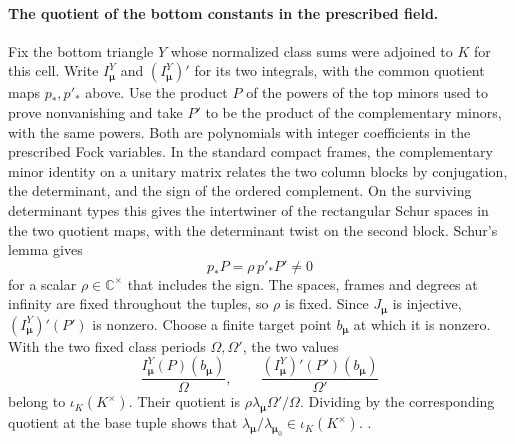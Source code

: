 \paragraph{The quotient of the bottom constants in the prescribed field.}
Fix the bottom triangle \(Y\) whose normalized class sums were
adjoined to \(K\) for this cell. Write \(I^Y_{\boldsymbol\mu}\) and
\((I^Y_{\boldsymbol\mu})'\) for its two integrals, with the common
quotient maps \(p_*,p'_*\) above. Use the product \(P\) of the powers
of the top minors used to prove nonvanishing and take \(P'\) to be
the product of the complementary minors, with the same powers.
Both are polynomials with integer coefficients in the prescribed
Fock variables. In the standard compact frames, the complementary
minor identity on a unitary matrix relates the two column blocks
by conjugation, the determinant, and the sign of the ordered
complement. On the surviving determinant types this gives the
intertwiner of the rectangular Schur spaces in the two quotient
maps, with the determinant twist on the second block. Schur's
lemma gives
\[
   p_*P=\rho\,p'_*P'\ne0
\]
for a scalar \(\rho\in\mathbb C^\times\) that includes the sign.
The spaces, frames and degrees at infinity are fixed throughout
the tuples, so \(\rho\) is fixed. Since \(J_{\boldsymbol\mu}\) is
injective, \((I^Y_{\boldsymbol\mu})'(P')\) is nonzero. Choose a
finite target point \(b_{\boldsymbol\mu}\) at which it is nonzero.
With the two fixed class periods \(\Omega,\Omega'\), the two values
\[
 \frac{I^Y_{\boldsymbol\mu}(P)(b_{\boldsymbol\mu})}{\Omega},
 \qquad
 \frac{(I^Y_{\boldsymbol\mu})'(P')(b_{\boldsymbol\mu})}{\Omega'}
\]
belong to \(\iota_K(K^\times)\). Their quotient is
\(\rho\lambda_{\boldsymbol\mu}\Omega'/\Omega\). Dividing by the
corresponding quotient at the base tuple shows that
\(\lambda_{\boldsymbol\mu}/\lambda_{\boldsymbol\mu_0}
\in\iota_K(K^\times)\).
.


